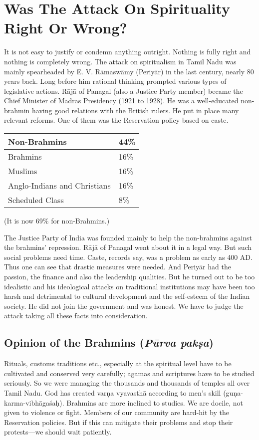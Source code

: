 \section{Was The Attack On Spirituality Right Or Wrong?}

It is not easy to justify or condemn anything outright. Nothing is fully right and nothing is completely wrong. The attack on spiritualism in Tamil Nadu was mainly spearheaded by E. V. Rāmaswāmy (Periyār) in the last century, nearly 80 years back. Long before him rational thinking prompted various types of legislative actions. Rājā of Panagal (also a Justice Party member) became the Chief Minister of Madras Presidency (1921 to 1928). He was a well-educated non-brahmin having good relations with the British rulers. He put in place many relevant reforms. One of them was the Reservation policy based on caste.

\begin{longtable}{@{}|l|l|@{}}
\hline
Non-Brahmins & 44\% \\
\hline
Brahmins & 16\% \\
\hline
Muslims & 16\% \\
\hline
Anglo-Indians and Christians & 16\% \\
\hline
Scheduled Class & 8\% \\
\hline
\end{longtable}

(It is now 69\% for non-Brahmins.)

The Justice Party of India was founded mainly to help the non-brahmins against the brahmins’ repression. Rājā of Panagal went about it in a legal way. But such social problems need time. Caste, records say, was a problem as early as 400 AD. Thus one can see that drastic measures were needed. And Periyār had the passion, the finance and also the leadership qualities. But he turned out to be too idealistic and his ideological attacks on traditional institutions may have been too harsh and detrimental to cultural development and the self-esteem of the Indian society. He did not join the government and was honest. We have to judge the attack taking all these facts into consideration.

\subsection{Opinion of the Brahmins (\textit{Pūrva pakṣa})}

Rituals, customs traditions etc., especially at the spiritual level have to be cultivated and conserved very carefully; agamas and scriptures have to be studied seriously. So we were managing the thousands and thousands of temples all over Tamil Nadu. God has created varņa vyavasthā according to men’s skill (guņa-karma-vibhāgaśaḥ). Brahmins are more inclined to studies. We are docile, not given to violence or fight. Members of our community are hard-hit by the Reservation policies. But if this can mitigate their problems and stop their protests—we should wait patiently.


